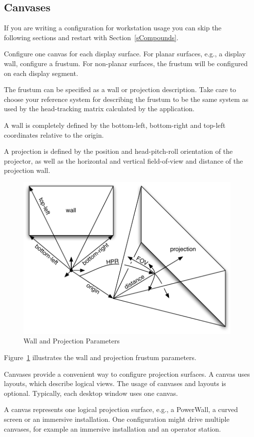 \documentclass[10pt,a4]{scrartcl}
\newcommand{\fig}[1]{Figure~\ref{#1}}
\newcommand{\sref}[1]{Section~\ref{#1}}
\begin{document}
\subsection{\label{sCanvas}Canvases}

If you are writing a configuration for workstation usage you can skip
the following sections and restart with \sref{sCompounds}.

Configure one \textsf{canvas} for each display surface. For planar
surfaces, e.g., a display wall, configure a frustum. For non-planar
surfaces, the frustum will be configured on each display segment.

The frustum can be specified as a wall or projection description. Take
care to choose your reference system for describing the frustum to be
the same system as used by the head-tracking matrix calculated by the
application.

A wall is completely defined by the bottom-left, bottom-right and
top-left coordinates relative to the origin.

A projection is defined by the position and head-pitch-roll orientation
of the projector, as well as the horizontal and vertical field-of-view
and distance of the projection wall.

\begin{figure}
  \includegraphics[width=.618\textwidth]{images/frusta.pdf}
  {\caption{\label{fFrusta}Wall and Projection Parameters}}
\end{figure}

\fig{fFrusta} illustrates the wall and projection frustum parameters.

Canvases provide a convenient way to configure projection surfaces. A
canvas uses layouts, which describe logical views. The usage of canvases
and layouts is optional. Typically, each desktop window uses one canvas.

A canvas represents one logical projection surface, e.g., a PowerWall, a
curved screen or an immersive installation. One configuration might
drive multiple canvases, for example an immersive installation and an
operator station.
\end{document}
